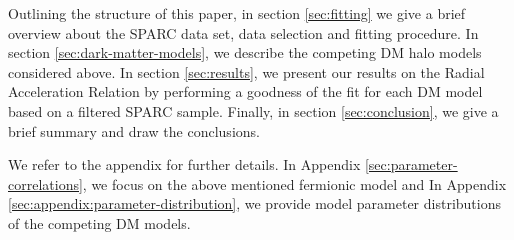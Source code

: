 Outlining the structure of this paper, in section \ref{sec:fitting} we give a brief overview about the SPARC data set, data selection and fitting procedure. In section \ref{sec:dark-matter-models}, we describe the competing DM halo models considered above. In section \ref{sec:results}, we present our results on the Radial Acceleration Relation by performing a goodness of the fit for each DM model based on a filtered SPARC sample.  Finally, in section \ref{sec:conclusion}, we give a brief summary and draw the conclusions.

We refer to the appendix for further details. In Appendix \ref{sec:parameter-correlations}, we focus on the above mentioned fermionic model and  In Appendix \ref{sec:appendix:parameter-distribution}, we provide model parameter distributions of the competing DM models.

